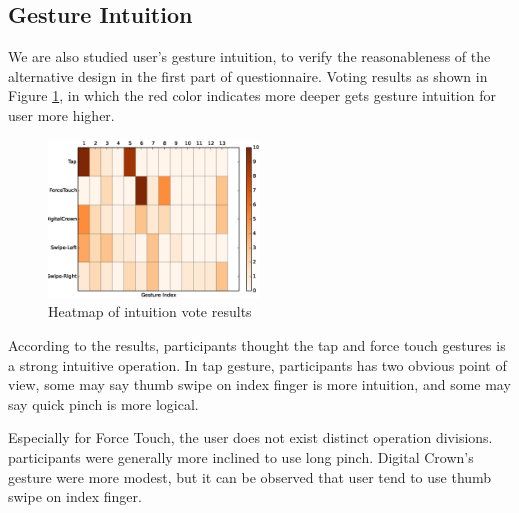 \subsection{Gesture Intuition}

We are also studied user's gesture intuition, to verify the reasonableness of the alternative design in the first part of questionnaire. Voting results as shown in Figure \ref{fig:heat}, in which the red color indicates more deeper gets gesture intuition for user more higher.

\begin{figure}[H]
    \kaishu
    \centering
    \includegraphics[width=0.5\textwidth]{figures/heat}
    \caption{\kaishu Heatmap of intuition vote results}
    \label{fig:heat}
\end{figure}

According to the results, participants thought the tap and force touch gestures is a strong intuitive operation. In tap gesture, participants has two obvious point of view, some may say thumb swipe on index finger is more intuition, and some may say quick pinch is more logical.

Especially for Force Touch, the user does not exist distinct operation divisions. participants were generally more inclined to use long pinch. Digital Crown's gesture were more modest, but it can be observed that user tend to use thumb swipe on index finger.

